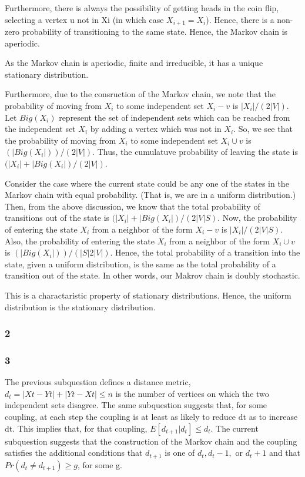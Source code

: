 \documentclass[10pt]{amsart}
\theoremstyle{remark}
\begin{document}
Furthermore, there is always the possibility of getting heads in the coin flip, selecting a vertex u not in Xi (in which case $X_{i+1}=X_{i}$). Hence, there is a non-zero probability of transitioning to the same state. Hence, the Markov chain is aperiodic.

As the Markov chain is aperiodic, finite and irreducible, it has a unique stationary distribution. 

Furthermore, due to the consruction of the Markov chain, we note that the probability of moving from $X_{i}$ to some independent set $X_{i}-{v}$ is $|X_{i}|/(2|V|)$. Let $Big(X_{i})$ represent the set of independent sets which can be reached from the independent set $X_{i}$ by adding a vertex which was not in $X_{i}$. So, we see that the probability of moving from $X_{i}$ to some independent set $X_{i}\cup {v}$ is $(|Big(X_{i}|))/(2|V|)$. Thus, the cumulatuve probability of leaving the state is $(|X_{i}|+|Big(X_{i}|)/(2|V|)$.

Consider the case where the current state could be any one of the states in the Markov chain with equal probability. (That is, we are in a uniform distribution.) Then, from the above discussion, we know that the total probability of transitions out of the state is $(|X_{i}|+|Big(X_{i}|)/(2|V|S)$. Now, the probability of entering the state $X_{i}$ from a neighbor of the form $X_{i}-{v}$ is $|X_{i}|/(2|V|S)$. Also, the probability of entering the state $X_{i}$ from a neighbor of the form $X_{i}\cup {v}$ is $(|Big(X_{i}|))/(|S|2|V|)$. Hence, the total probability of a transition into the state, given a uniform distribution, is the same as the total probability of a transition out of the state. In other words, our Makrov chain is doubly stochastic.

This is a charactaristic property of stationary distributions. Hence, the uniform distribution is the stationary distribution.

\subsubsection{2} 


\subsubsection{3} 
The previous subquestion defines a distance metric, $d_{t}=|Xt-Yt|+|Yt-Xt| \leq n$ is the number of vertices on which the two independent sets disagree. The same subquestion suggests that, for some coupling, at each step the coupling is at least as likely to reduce dt as to increase dt. This implies that, for that coupling, $E[d_{t+1}|d_{t}]\leq d_{t}$. The current subquestion suggests that the construction of the Markov chain and the coupling satisfies the additional conditions that $d_{t+1}$ is one of $d_{t}, d_{t}-1,$ or $d_{t}+1$ and that $Pr(d_{t} \neq d_{t+1})\geq g$, for some g.
\end{document}
